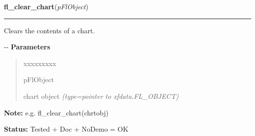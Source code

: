     \label{xformslib:flchart:fl_clear_chart}

    \vspace{0.5ex}

\hspace{.8\funcindent}\begin{boxedminipage}{\funcwidth}

    \raggedright \textbf{fl\_clear\_chart}(\textit{pFlObject})

    \vspace{-1.5ex}

    \rule{\textwidth}{0.5\fboxrule}
\setlength{\parskip}{2ex}

Clears the contents of a chart.

-{}-
\setlength{\parskip}{1ex}
      \textbf{Parameters}
      \vspace{-1ex}

      \begin{quote}
        \begin{Ventry}{xxxxxxxxx}

          \item[pFlObject]


chart object
            {\it (type=pointer to xfdata.FL\_OBJECT)}

        \end{Ventry}

      \end{quote}

\textbf{Note:} 
e.g.  fl\_clear\_chart(chrtobj)


\textbf{Status:} 
Tested + Doc + NoDemo = OK


    \end{boxedminipage}

    \label{xformslib:flchart:fl_add_chart_value}

    \vspace{0.5ex}

